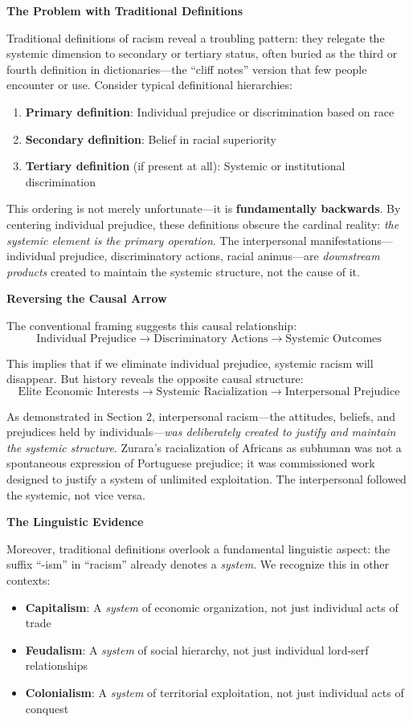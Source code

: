 \documentclass[12pt]{article}
\begin{document}
\textbf{The Problem with Traditional Definitions}

Traditional definitions of racism reveal a troubling pattern: they relegate the systemic dimension to secondary or tertiary status, often buried as the third or fourth definition in dictionaries---the ``cliff notes'' version that few people encounter or use. Consider typical definitional hierarchies:

\begin{enumerate}
    \item \textbf{Primary definition}: Individual prejudice or discrimination based on race
    \item \textbf{Secondary definition}: Belief in racial superiority
    \item \textbf{Tertiary definition} (if present at all): Systemic or institutional discrimination
\end{enumerate}

This ordering is not merely unfortunate---it is \textbf{fundamentally backwards}. By centering individual prejudice, these definitions obscure the cardinal reality: \textit{the systemic element is the primary operation}. The interpersonal manifestations---individual prejudice, discriminatory actions, racial animus---are \textit{downstream products} created to maintain the systemic structure, not the cause of it.

\textbf{Reversing the Causal Arrow}

The conventional framing suggests this causal relationship:
\[
\text{Individual Prejudice} \rightarrow \text{Discriminatory Actions} \rightarrow \text{Systemic Outcomes}
\]

This implies that if we eliminate individual prejudice, systemic racism will disappear. But history reveals the opposite causal structure:
\[
\text{Elite Economic Interests} \rightarrow \text{Systemic Racialization} \rightarrow \text{Interpersonal Prejudice}
\]

As demonstrated in Section 2, interpersonal racism---the attitudes, beliefs, and prejudices held by individuals---\textit{was deliberately created to justify and maintain the systemic structure}. Zurara's racialization of Africans as subhuman was not a spontaneous expression of Portuguese prejudice; it was commissioned work designed to justify a system of unlimited exploitation. The interpersonal followed the systemic, not vice versa.

\textbf{The Linguistic Evidence}

Moreover, traditional definitions overlook a fundamental linguistic aspect: the suffix ``-ism'' in ``racism'' already denotes a \textit{system}. We recognize this in other contexts:
\begin{itemize}
    \item \textbf{Capitalism}: A \textit{system} of economic organization, not just individual acts of trade
    \item \textbf{Feudalism}: A \textit{system} of social hierarchy, not just individual lord-serf relationships
    \item \textbf{Colonialism}: A \textit{system} of territorial exploitation, not just individual acts of conquest
\end{itemize}
\end{document}
